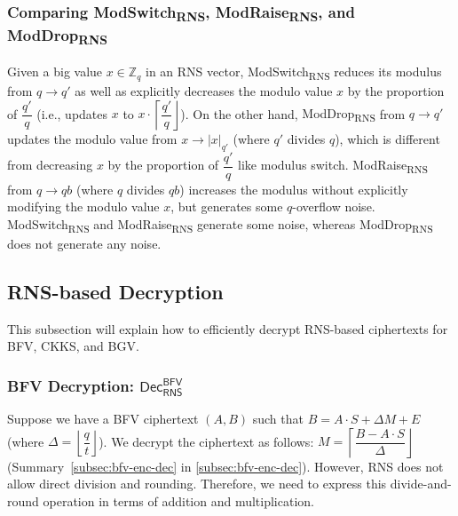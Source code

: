 \subsubsection{Comparing \textsf{ModSwitch\textsubscript{RNS}}, \textsf{ModRaise\textsubscript{RNS}}, and \textsf{ModDrop\textsubscript{RNS}}}

Given a big value $x \in \mathbb{Z}_q$ in an RNS vector, \textsf{ModSwitch\textsubscript{RNS}} reduces its modulus from $q \rightarrow  q'$ as well as explicitly decreases the modulo value $x$ by the proportion of $\dfrac{q'}{q}$ (i.e., updates $x$ to $x \cdot \left\lceil\dfrac{q'}{q}\right\rfloor$). On the other hand, \textsf{ModDrop\textsubscript{RNS}} from $q \rightarrow q'$ updates the modulo value from $x \rightarrow |x|_{q'}$ (where $q'$ divides $q$), which is different from decreasing $x$ by the proportion of $\dfrac{q'}{q}$ like modulus switch. \textsf{ModRaise\textsubscript{RNS}} from $q \rightarrow qb$ (where $q$ divides $qb$) increases the modulus without explicitly modifying the modulo value $x$, but generates some $q$-overflow noise. \textsf{ModSwitch\textsubscript{RNS}} and \textsf{ModRaise\textsubscript{RNS}} generate some noise, whereas \textsf{ModDrop\textsubscript{RNS}} does not generate any noise. %




\subsection{RNS-based Decryption}
\label{subsec:rns-dec}

This subsection will explain how to efficiently decrypt RNS-based ciphertexts for BFV, CKKS, and BGV. 


\subsubsection{BFV Decryption: $\textsf{Dec}_{\textsf{RNS}}^{\textsf{BFV}}$}
\label{subsubsec:rns-dec-bfv}

Suppose we have a BFV ciphertext $(A, B)$ such that $B = A\cdot S + \Delta M + E$ (where $\Delta = \left\lfloor\dfrac{q}{t}\right\rfloor$). We decrypt the ciphertext as follows: $M = \left\lceil\dfrac{B - A\cdot S}{\Delta}\right\rfloor$ (Summary~\ref*{subsec:bfv-enc-dec} in \autoref{subsec:bfv-enc-dec}). However, RNS does not allow direct division and rounding. Therefore, we need to express this divide-and-round operation in terms of addition and multiplication.

